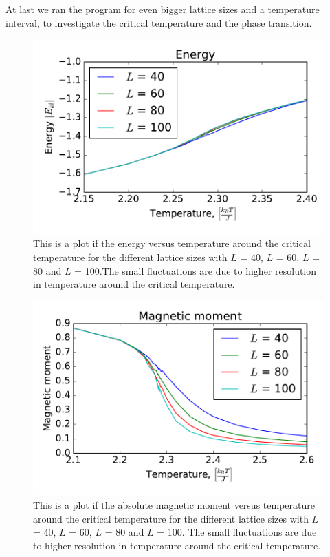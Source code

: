 At last we ran the program for even bigger lattice sizes and a temperature interval, to investigate the critical temperature and the phase transition.

\begin{figure}[H]
\includegraphics[width=\linewidth]{../results/4e/4e_energy}\caption{This is a plot if the energy versus temperature around the critical temperature for the different lattice sizes with $L$ = 40, $L$ = 60, $L$ = 80 and $L$ = 100.The small fluctuations are due to higher resolution in temperature around the critical temperature.}\label{fig:4e_energy}
\end{figure}

\begin{figure}[H]
\includegraphics[width=\linewidth]{../results/4e/4e_mag}\caption{This is a plot if the absolute magnetic moment versus temperature around the critical temperature for the different lattice sizes with $L$ = 40, $L$ = 60, $L$ = 80 and $L$ = 100. The small fluctuations are due to higher resolution in temperature around the critical temperature.}\label{fig:4e_magnetic}
\end{figure}

